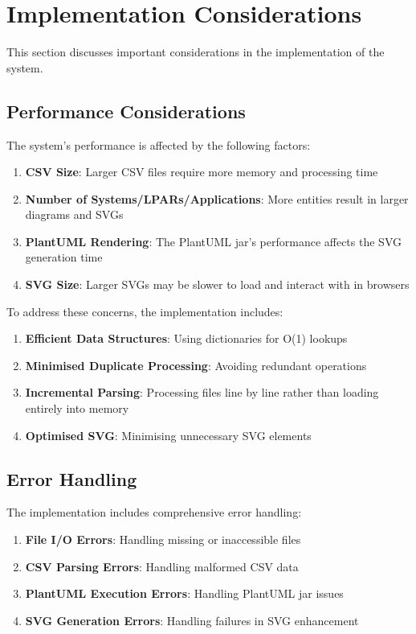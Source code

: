 \documentclass[a4paper,12pt]{article}
\begin{document}
\section{Implementation Considerations}

This section discusses important considerations in the implementation of the system.

\subsection{Performance Considerations}

The system's performance is affected by the following factors:

\begin{enumerate}
    \item \textbf{CSV Size}: Larger CSV files require more memory and processing time
    \item \textbf{Number of Systems/LPARs/Applications}: More entities result in larger diagrams and SVGs
    \item \textbf{PlantUML Rendering}: The PlantUML jar's performance affects the SVG generation time
    \item \textbf{SVG Size}: Larger SVGs may be slower to load and interact with in browsers
\end{enumerate}

To address these concerns, the implementation includes:

\begin{enumerate}
    \item \textbf{Efficient Data Structures}: Using dictionaries for O(1) lookups
    \item \textbf{Minimised Duplicate Processing}: Avoiding redundant operations
    \item \textbf{Incremental Parsing}: Processing files line by line rather than loading entirely into memory
    \item \textbf{Optimised SVG}: Minimising unnecessary SVG elements
\end{enumerate}

\subsection{Error Handling}

The implementation includes comprehensive error handling:

\begin{enumerate}
    \item \textbf{File I/O Errors}: Handling missing or inaccessible files
    \item \textbf{CSV Parsing Errors}: Handling malformed CSV data
    \item \textbf{PlantUML Execution Errors}: Handling PlantUML jar issues
    \item \textbf{SVG Generation Errors}: Handling failures in SVG enhancement
\end{enumerate}
\end{document}
